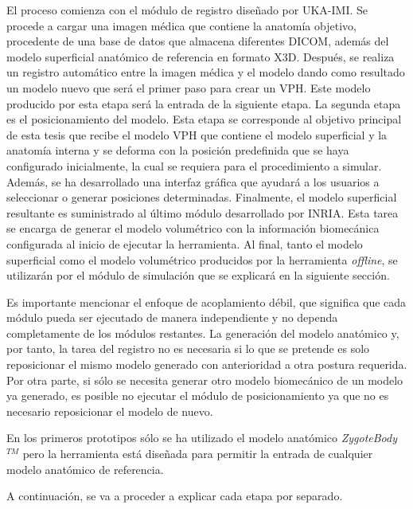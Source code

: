 El proceso comienza con el módulo de registro diseñado por \ac{UKA-IMI}. Se procede a cargar una imagen médica que contiene la anatomía objetivo, procedente de una base de datos que almacena diferentes \ac{DICOM}, además del modelo superficial anatómico de referencia en formato \ac{X3D}. Después, se realiza un registro automático entre la imagen médica y el modelo dando como resultado un modelo nuevo que será el primer paso para crear un \ac{VPH}. Este modelo producido por esta etapa será la entrada de la siguiente etapa. 
La segunda etapa es el posicionamiento del modelo. Esta etapa se corresponde al objetivo principal de esta tesis que recibe el modelo \ac{VPH} que contiene el modelo superficial y la anatomía interna y se deforma con la posición predefinida que se haya configurado inicialmente, la cual se requiera para el procedimiento a simular. Además, se ha desarrollado una interfaz gráfica que ayudará a los usuarios a seleccionar o generar posiciones determinadas.
Finalmente, el modelo superficial resultante es suministrado al último módulo desarrollado por \ac{INRIA}. Esta tarea se encarga de generar el modelo volumétrico con la información biomecánica configurada al inicio de ejecutar la herramienta.
Al final, tanto el modelo superficial como el modelo volumétrico producidos por la herramienta \emph{offline}, se utilizarán por el módulo de simulación que se explicará en la siguiente sección.

Es importante mencionar el enfoque de acoplamiento débil, que significa que cada módulo pueda ser ejecutado de manera independiente y no dependa completamente de los módulos restantes. La generación del modelo anatómico y, por tanto, la tarea del registro no es necesaria si lo que se pretende es solo reposicionar el mismo modelo generado con anterioridad a otra postura requerida. Por otra parte, si sólo se necesita generar otro modelo biomecánico de un modelo ya generado, es posible no ejecutar el módulo de posicionamiento ya que no es necesario reposicionar el modelo de nuevo.

En los primeros prototipos sólo se ha utilizado el modelo anatómico \emph{ZygoteBody}$^{TM}$ pero la herramienta está diseñada para permitir la entrada de cualquier modelo anatómico de referencia. 

A continuación, se va a proceder a explicar cada etapa por separado.


